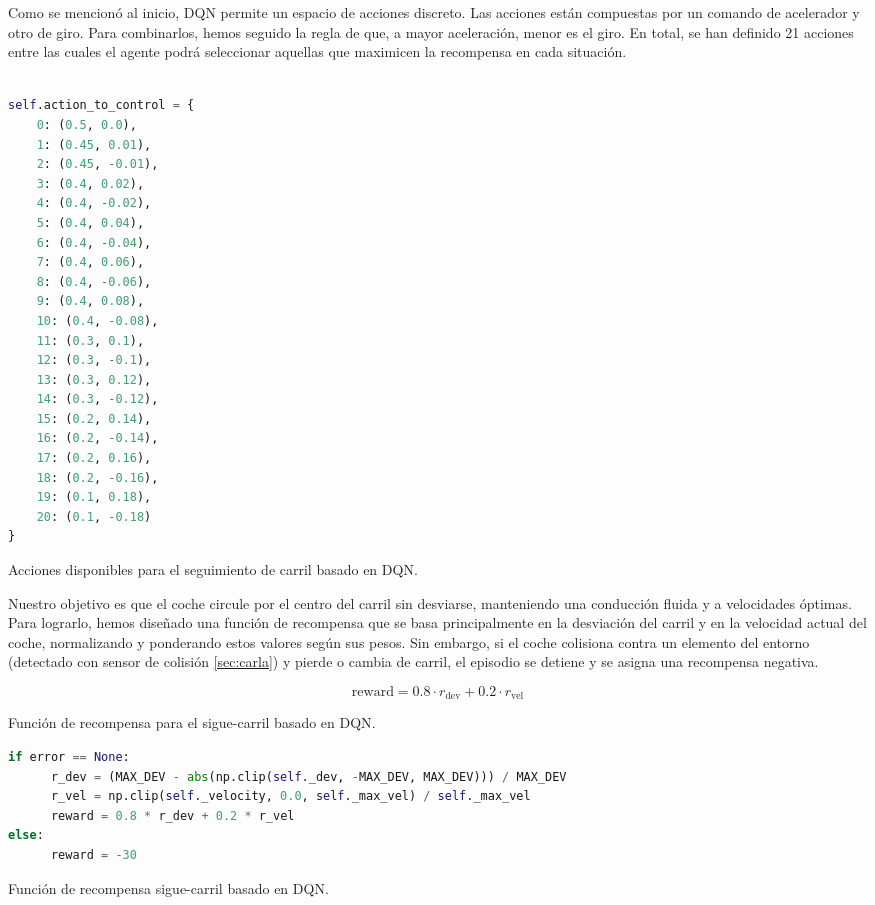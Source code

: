 Como se mencionó al inicio, \ac{DQN} permite un espacio de acciones discreto. Las acciones están compuestas por un comando de acelerador y otro de giro. Para combinarlos, hemos seguido la regla de que, a mayor aceleración, menor es el giro. En total, se han definido 21 acciones entre las cuales el agente podrá seleccionar aquellas que maximicen la recompensa en cada situación.
\begin{code}[h]
\begin{lstlisting}[language=Python]

self.action_to_control = {
    0: (0.5, 0.0),
    1: (0.45, 0.01), 
    2: (0.45, -0.01),
    3: (0.4, 0.02),
    4: (0.4, -0.02),
    5: (0.4, 0.04),
    6: (0.4, -0.04),
    7: (0.4, 0.06),
    8: (0.4, -0.06),
    9: (0.4, 0.08),
    10: (0.4, -0.08),
    11: (0.3, 0.1),
    12: (0.3, -0.1),
    13: (0.3, 0.12),
    14: (0.3, -0.12),
    15: (0.2, 0.14),
    16: (0.2, -0.14),
    17: (0.2, 0.16),
    18: (0.2, -0.16),
    19: (0.1, 0.18),
    20: (0.1, -0.18)
}
\end{lstlisting}
\caption[Acciones disponibles para el seguimiento de carril basado en \ac{DQN}]{Acciones disponibles para el seguimiento de carril basado en \ac{DQN}.}
\label{cod:acc_dqn}
\end{code}

Nuestro objetivo es que el coche circule por el centro del carril sin desviarse, manteniendo una conducción fluida y a velocidades óptimas. Para lograrlo, hemos diseñado una función de recompensa que se basa principalmente en la desviación del carril y en la velocidad actual del coche, normalizando y ponderando estos valores según sus pesos. Sin embargo, si el coche colisiona contra un elemento del entorno (detectado con sensor de colisión \ref{sec:carla}) y pierde o cambia de carril, el episodio se detiene y se asigna una recompensa negativa.
  \begin{myequation}[h]
    \begin{equation} 
      \text{reward} = 0.8 \cdot r_{\text{dev}} + 0.2 \cdot r_{\text{vel}} 
    \end{equation} 
    \caption{Función de recompensa para el sigue-carril basado en \ac{DQN}.}
\label{eq:rew_ppo}
  \end{myequation}
\begin{code}[h]
\begin{lstlisting}[language=Python]
if error == None:
      r_dev = (MAX_DEV - abs(np.clip(self._dev, -MAX_DEV, MAX_DEV))) / MAX_DEV
      r_vel = np.clip(self._velocity, 0.0, self._max_vel) / self._max_vel
      reward = 0.8 * r_dev + 0.2 * r_vel
else:
      reward = -30
\end{lstlisting}
\caption[Función de recompensa sigue-carril basado en \ac{DQN}]{Función de recompensa sigue-carril basado en \ac{DQN}.}
\label{cod:rew_dqn}
\end{code}

